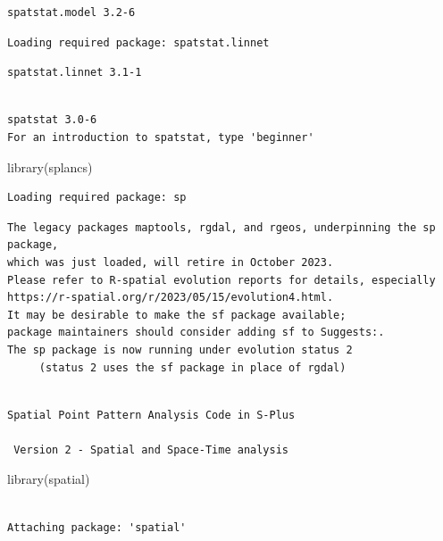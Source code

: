 \documentclass[
  letterpaper,
  DIV=11,
  numbers=noendperiod]{scrartcl}
\newenvironment{Shaded}{\begin{snugshade}}{\end{snugshade}}
\newcommand{\FunctionTok}[1]{\textcolor[rgb]{0.28,0.35,0.67}{#1}}
\newcommand{\NormalTok}[1]{\textcolor[rgb]{0.00,0.23,0.31}{#1}}
\begin{document}
\begin{verbatim}
spatstat.model 3.2-6
\end{verbatim}

\begin{verbatim}
Loading required package: spatstat.linnet
\end{verbatim}

\begin{verbatim}
spatstat.linnet 3.1-1
\end{verbatim}

\begin{verbatim}

spatstat 3.0-6 
For an introduction to spatstat, type 'beginner' 
\end{verbatim}

\begin{Shaded}
\begin{Highlighting}[]
\FunctionTok{library}\NormalTok{(splancs)}
\end{Highlighting}
\end{Shaded}

\begin{verbatim}
Loading required package: sp
\end{verbatim}

\begin{verbatim}
The legacy packages maptools, rgdal, and rgeos, underpinning the sp package,
which was just loaded, will retire in October 2023.
Please refer to R-spatial evolution reports for details, especially
https://r-spatial.org/r/2023/05/15/evolution4.html.
It may be desirable to make the sf package available;
package maintainers should consider adding sf to Suggests:.
The sp package is now running under evolution status 2
     (status 2 uses the sf package in place of rgdal)
\end{verbatim}

\begin{verbatim}

Spatial Point Pattern Analysis Code in S-Plus
 
 Version 2 - Spatial and Space-Time analysis
\end{verbatim}

\begin{Shaded}
\begin{Highlighting}[]
\FunctionTok{library}\NormalTok{(spatial)}
\end{Highlighting}
\end{Shaded}

\begin{verbatim}

Attaching package: 'spatial'
\end{verbatim}
\end{document}
